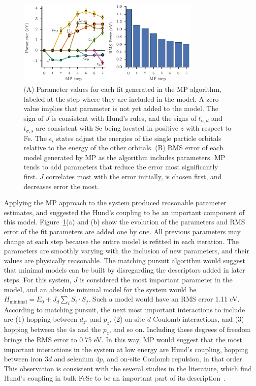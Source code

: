 \begin{figure}
  \centering
  \includegraphics[width=0.8\textwidth]{./Figures/fese.eps}
  \caption{
    \label{fig:fese} 
    (A) Parameter values for each fit generated in the MP algorithm, labeled at the step where they are included in the model. 
    A zero value implies that parameter is not yet added to the model.
    The sign of $J$ is consistent with Hund's rules, and the signs of $t_{\sigma,d}$ and $t_{\sigma,s}$ are consistent with Se being located in positive $z$ with respect to Fe. 
    The $\epsilon_i$ states adjust the energies of the single particle orbitals relative to the energy of the other orbitals.
    (B) RMS error of each model generated by MP as the algorithm includes parameters. 
    MP tends to add parameters that reduce the error most significantly first. 
    $J$ correlates most with the error initially, is chosen first, and decreases error the most.
  }
\end{figure}

Applying the MP approach to the system produced reasonable parameter estimates, and suggested the Hund's coupling to be an important component of this model.
Figure~\ref{fig:fese}(a) and (b) show the evolution of the parameters and RMS error of the fit parameters are added one by one.
All previous parameters may change at each step because the entire model is refitted in each iteration.
The parameters are smoothly varying with the inclusion of new parameters, and their values are physically reasonable.
The matching pursuit algorithm would suggest that minimal models can be built by disregarding the descriptors added in later steps.
For this system, $J$ is considered the most important parameter in the model, and an absolute minimal model for the system would be $H_\text{minimal} = E_0 + J_d \sum_i S_i \cdot S_j$. 
Such a model would have an RMS error 1.11 eV. 
According to matching pursuit, the next most important interactions to include are (1) hopping between $d_{z^2}$ and $p_z$, (2) on-site $d$ Coulomb interactions, and (3) hopping between the $4s$ and the $p_z$, and so on. 
Including these degrees of freedom brings the RMS error to 0.75 eV.
In this way, MP would suggest that the most important interactions in the system at low energy are Hund's coupling, hopping between iron $3d$ and selenium $4p$, and on-site Coulomb repulsion, in that order.
This observation is consistent with the several studies in the literature, which find Hund's coupling in bulk FeSe to be an important part of its description~\cite{demedici_hunds_2011,de_medici_janus-faced_2011,georges_strong_2013,busemeyer_competing_2016}.

